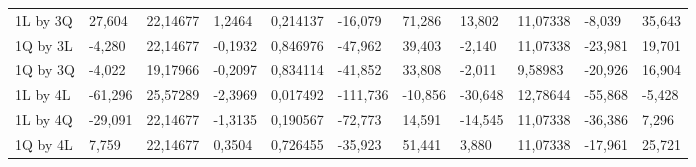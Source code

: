 \begin{table}[H]
{\begin{tabular}{lllllllllll}
\rowcolor[HTML]{FFFFFF} 
{\color[HTML]{000000} 1L by 3Q}       & {\color[HTML]{000000} 27,604}   & {\color[HTML]{000000} 22,14677} & {\color[HTML]{000000} 1,2464}   & {\color[HTML]{000000} 0,214137} & {\color[HTML]{000000} -16,079}        & {\color[HTML]{000000} 71,286}         & {\color[HTML]{000000} 13,802}   & {\color[HTML]{000000} 11,07338}      & {\color[HTML]{000000} -8,039}         & {\color[HTML]{000000} 35,643}         \\
\rowcolor[HTML]{FFFFFF} 
{\color[HTML]{000000} 1Q by 3L}       & {\color[HTML]{000000} -4,280}   & {\color[HTML]{000000} 22,14677} & {\color[HTML]{000000} -0,1932}  & {\color[HTML]{000000} 0,846976} & {\color[HTML]{000000} -47,962}        & {\color[HTML]{000000} 39,403}         & {\color[HTML]{000000} -2,140}   & {\color[HTML]{000000} 11,07338}      & {\color[HTML]{000000} -23,981}        & {\color[HTML]{000000} 19,701}         \\
\rowcolor[HTML]{FFFFFF} 
{\color[HTML]{000000} 1Q by 3Q}       & {\color[HTML]{000000} -4,022}   & {\color[HTML]{000000} 19,17966} & {\color[HTML]{000000} -0,2097}  & {\color[HTML]{000000} 0,834114} & {\color[HTML]{000000} -41,852}        & {\color[HTML]{000000} 33,808}         & {\color[HTML]{000000} -2,011}   & {\color[HTML]{000000} 9,58983}       & {\color[HTML]{000000} -20,926}        & {\color[HTML]{000000} 16,904}         \\
\rowcolor[HTML]{FFFFFF} 
{\color[HTML]{000000} 1L by 4L}       & {\color[HTML]{FF0000} -61,296}  & {\color[HTML]{FF0000} 25,57289} & {\color[HTML]{FF0000} -2,3969}  & {\color[HTML]{FF0000} 0,017492} & {\color[HTML]{FF0000} -111,736}       & {\color[HTML]{FF0000} -10,856}        & {\color[HTML]{FF0000} -30,648}  & {\color[HTML]{FF0000} 12,78644}      & {\color[HTML]{FF0000} -55,868}        & {\color[HTML]{FF0000} -5,428}         \\
\rowcolor[HTML]{FFFFFF} 
{\color[HTML]{000000} 1L by 4Q}       & {\color[HTML]{000000} -29,091}  & {\color[HTML]{000000} 22,14677} & {\color[HTML]{000000} -1,3135}  & {\color[HTML]{000000} 0,190567} & {\color[HTML]{000000} -72,773}        & {\color[HTML]{000000} 14,591}         & {\color[HTML]{000000} -14,545}  & {\color[HTML]{000000} 11,07338}      & {\color[HTML]{000000} -36,386}        & {\color[HTML]{000000} 7,296}          \\
\rowcolor[HTML]{FFFFFF} 
{\color[HTML]{000000} 1Q by 4L}       & {\color[HTML]{000000} 7,759}    & {\color[HTML]{000000} 22,14677} & {\color[HTML]{000000} 0,3504}   & {\color[HTML]{000000} 0,726455} & {\color[HTML]{000000} -35,923}        & {\color[HTML]{000000} 51,441}         & {\color[HTML]{000000} 3,880}    & {\color[HTML]{000000} 11,07338}      & {\color[HTML]{000000} -17,961}        & {\color[HTML]{000000} 25,721}         \\

\end{tabular}}
\end{table}
